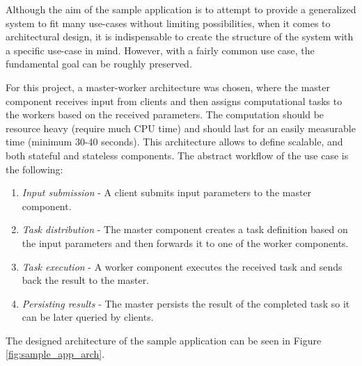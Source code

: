 Although the aim of the sample application is to attempt to provide a generalized system to fit many use-cases without limiting possibilities, when it comes to architectural design, it is indispensable to create the structure of the system with a specific use-case in mind. However, with a fairly common use case, the fundamental goal can be roughly preserved.

For this project, a master-worker architecture was chosen, where the master component receives input from clients and then assigns computational tasks to the workers based on the received parameters. The computation should be resource heavy (\eg require much CPU time) and should last for an easily measurable time (minimum 30-40 seconds). This architecture allows to define scalable, and both stateful and stateless components. The abstract workflow of the use case is the following:


\begin{enumerate}
	\item \emph{Input submission} - A client submits input parameters to the master component.
	\item \emph{Task distribution} - The master component creates a task definition based on the input parameters and then forwards it to one of the worker components.
	\item \emph{Task execution} - A worker component executes the received task and sends back the result to the master.
	\item \emph{Persisting results} - The master persists the result of the completed task so it can be later queried by clients.
\end{enumerate}

The designed architecture of the sample application can be seen in Figure \ref{fig:sample_app_arch}.

